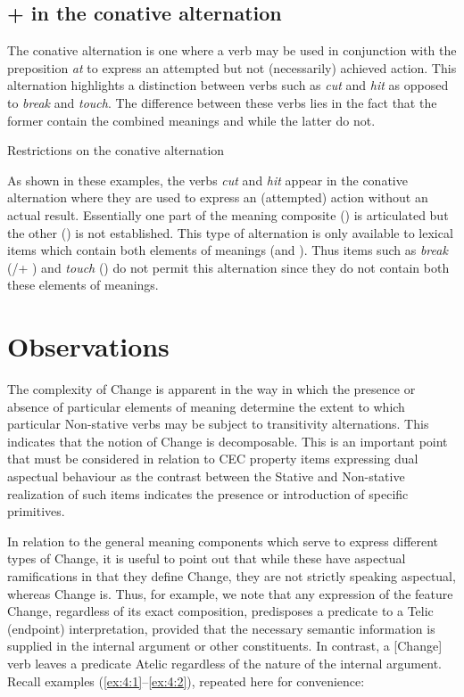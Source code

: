 \subsection{\MOTION + \CONTACT in the conative alternation}\label{sec:4.4.3}
The conative alternation is one where a verb may be used in
conjunction with the preposition \textit{at} to express an attempted but not
(necessarily) achieved action.  This alternation highlights a
distinction between verbs such as \textit{cut} and \textit{hit} as opposed to
\textit{break} and \textit{touch}.  The difference between these verbs lies in the
fact that the former contain the combined meanings \MOTION and \CONTACT
while the latter do not.

\ea\label{ex:4:18} Restrictions on the conative alternation \citep[6 example 14]{Levin1993}
\z \z

As shown in these examples, the verbs \textit{cut} and \textit{hit} appear in the
conative alternation where they are used to express an (attempted)
action without an actual result.  Essentially one part of the meaning
composite (\MOTION) is articulated but the other (\CONTACT) is not
established.  This type of alternation is only available to lexical
items which contain both elements of meanings (\MOTION and
\CONTACT). Thus items such as \textit{break} (\BECOME\slash\CAUSE + \BECOME) and
\textit{touch} (\CONTACT) do not permit this alternation since they do not
contain both these elements of meanings.

\section{Observations}\label{sec:4.5}

The complexity of Change is apparent in the way in which the presence
or absence of particular elements of meaning determine the extent to
which particular Non-stative verbs may be subject to transitivity
alternations.  This indicates that the notion of Change is
decomposable.  This is an important point that must be considered in
relation to CEC property items expressing dual aspectual behaviour as
the contrast between the Stative and Non-stative realization of such
items indicates the presence or introduction of specific primitives.

In relation to the general meaning components which serve to express
different types of Change, it is useful to point out that while these
have aspectual ramifications in that they define Change, they are not
strictly speaking aspectual, whereas Change is.  Thus, for example, we
note that any expression of the feature Change, regardless of its
exact composition, predisposes a predicate to a Telic (endpoint)
interpretation, provided that the necessary semantic information is
supplied in the internal argument or other constituents.  In contrast,
a [\textminus Change] verb leaves a predicate Atelic regardless of the nature of
the internal argument.  Recall examples (\ref{ex:4:1}--\ref{ex:4:2}), repeated here for
convenience:

